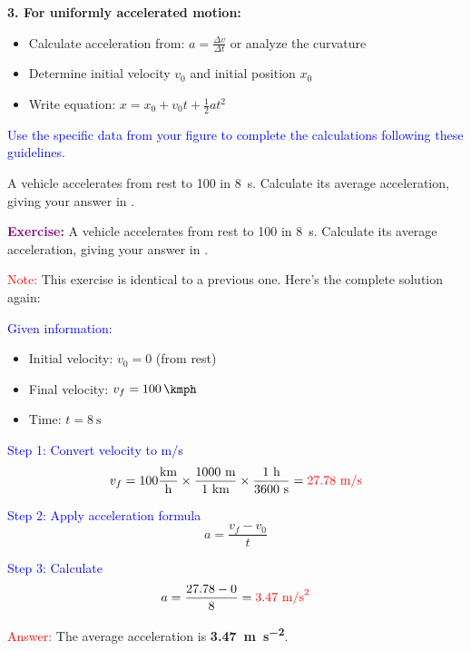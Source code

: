 \begin{exercise}
\begin{solu}
        \textbf{3. For uniformly accelerated motion:}
        \begin{itemize}
            \item Calculate acceleration from: $a = \frac{\Delta v}{\Delta t}$ or analyze the curvature
            \item Determine initial velocity $v_0$ and initial position $x_0$
            \item Write equation: $x = x_0 + v_0 t + \frac{1}{2}at^2$
        \end{itemize}

        \textcolor{blue}{Use the specific data from your figure to complete the calculations following these guidelines.}
    \end{solu}
\end{exercise}


\begin{exercise}
    A vehicle accelerates from rest to \qty{100}{\kmph} in \qty{8}{\s}. Calculate its average acceleration, giving your answer in \unit{\mpss}.

    \begin{solu}
        \textbf{\textcolor{purple}{Exercise:}} A vehicle accelerates from rest to \qty{100}{\kmph} in \qty{8}{\s}. Calculate its average acceleration, giving your answer in \unit{\mpss}.

        \vspace{0.3cm}

        \textcolor{red}{Note:} This exercise is identical to a previous one. Here's the complete solution again:

        \textcolor{blue}{Given information:}
        \begin{itemize}
            \item Initial velocity: $v_0 = 0$ (from rest)
            \item Final velocity: $v_f = \qty{100}{\kmph}$
            \item Time: $t = \qty{8}{\s}$
        \end{itemize}

        \textcolor{blue}{Step 1: Convert velocity to m/s}
        \[
            v_f = 100 \frac{\text{km}}{\text{h}} \times \frac{1000 \text{ m}}{1 \text{ km}} \times \frac{1 \text{ h}}{3600 \text{ s}} = \textcolor{red}{27.78 \text{ m/s}}
        \]

        \textcolor{blue}{Step 2: Apply acceleration formula}
        \[
            \boxed{a = \frac{v_f - v_0}{t}}
        \]

        \textcolor{blue}{Step 3: Calculate}
        \[
            a = \frac{27.78 - 0}{8} = \textcolor{red}{3.47 \text{ m/s}^2}
        \]

        \textcolor{red}{Answer:} The average acceleration is \textbf{\qty{3.47}{\metre\per\second\squared}}.
    \end{solu}
\end{exercise}

